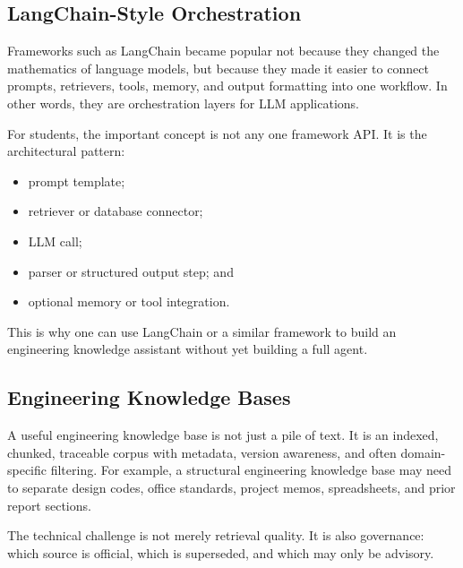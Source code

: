 \documentclass[12pt]{article}
\begin{document}
\subsection{LangChain-Style Orchestration}

Frameworks such as LangChain became popular not because they changed the mathematics of language models, but because they made it easier to connect prompts, retrievers, tools, memory, and output formatting into one workflow. In other words, they are orchestration layers for LLM applications.

For students, the important concept is not any one framework API. It is the architectural pattern:
\begin{itemize}
    \item prompt template;
    \item retriever or database connector;
    \item LLM call;
    \item parser or structured output step; and
    \item optional memory or tool integration.
\end{itemize}

This is why one can use LangChain or a similar framework to build an engineering knowledge assistant without yet building a full agent.

\subsection{Engineering Knowledge Bases}

A useful engineering knowledge base is not just a pile of text. It is an indexed, chunked, traceable corpus with metadata, version awareness, and often domain-specific filtering. For example, a structural engineering knowledge base may need to separate design codes, office standards, project memos, spreadsheets, and prior report sections.

The technical challenge is not merely retrieval quality. It is also governance: which source is official, which is superseded, and which may only be advisory.
\end{document}
